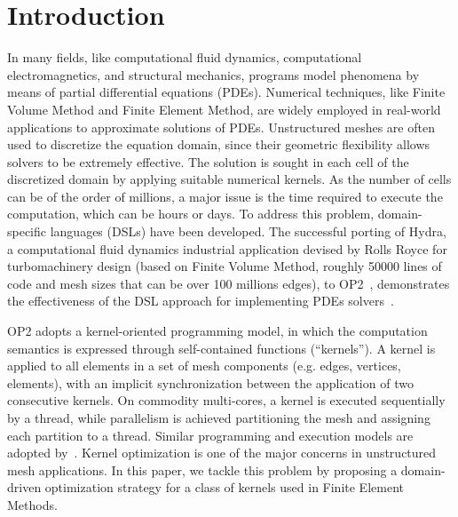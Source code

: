 \documentclass[conference]{IEEEtran}
\begin{document}
\section{Introduction}
In many fields, like computational fluid dynamics, computational electromagnetics, and structural mechanics, programs model phenomena by means of partial differential equations (PDEs). Numerical techniques, like Finite Volume Method and Finite Element Method, are widely employed in real-world applications to approximate solutions of PDEs. Unstructured meshes are often used to discretize the equation domain, since their geometric flexibility allows solvers to be extremely effective. The solution is sought in each cell of the discretized domain by applying suitable numerical kernels. As the number of cells can be of the order of millions, a major issue is the time required to execute the computation, which can be hours or days. To address this problem, domain-specific languages (DSLs) have been developed. The successful porting of Hydra, a computational fluid dynamics industrial application devised by Rolls Royce for turbomachinery design (based on Finite Volume Method, roughly 50000 lines of code and mesh sizes that can be over 100 millions edges), to OP2~\cite{pyop2ics}, demonstrates the effectiveness of the DSL approach for implementing PDEs solvers~\cite{OP2-hydra}. 

OP2 adopts a kernel-oriented programming model, in which the computation semantics is expressed through self-contained functions (``kernels''). A kernel is applied to all elements in a set of mesh components (e.g. edges, vertices, elements), with an implicit synchronization between the application of two consecutive kernels. On commodity multi-cores, a kernel is executed sequentially by a thread, while parallelism is achieved partitioning the mesh and assigning each partition to a thread. Similar programming and execution models are adopted by~\cite{fenics, fluidity, lizst}. Kernel optimization is one of the major concerns in unstructured mesh applications. In this paper, we tackle this problem by proposing a domain-driven optimization strategy for a class of kernels used in Finite Element Methods.
\end{document}
